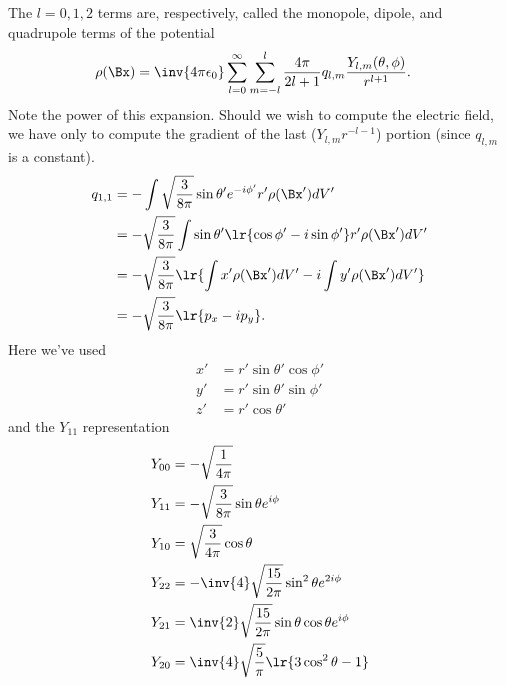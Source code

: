 %
The \( l = 0,1,2\) terms are, respectively, called the monopole, dipole, and quadrupole terms of the potential
\begin{equation}\label{eqn:emtLecture8:500}
\begin{aligned}
\rho(\Bx) &=
\inv{4 \pi \epsilon_0}
\sum_{l = 0}^\infty \sum_{m = -l}^l \frac{4\pi} {2 l + 1}
q_{l,m}
\frac{
Y_{l,m}(\theta, \phi)
}
{
r^{l+1}
}.
\end{aligned}
\end{equation}
%
Note the power of this expansion.  Should we wish to compute the electric field, we have only to compute the gradient of  the last (\(Y_{l,m} r^{-l-1} \)) portion (since \( q_{l,m} \) is a constant).
%
\begin{equation}\label{eqn:emtLecture8:520}
\begin{aligned}
q_{1,1}
&=
-\int \sqrt{\frac{3}{8 \pi}} \sin\theta' e^{-i\phi'} r' \rho(\Bx') dV'
\\ &=
-\sqrt{\frac{3}{8 \pi}} \int \sin\theta' \lr{ \cos\phi' - i\sin\phi'} r' \rho(\Bx') dV'
\\ &=
-\sqrt{\frac{3}{8 \pi}} \lr{
\int x' \rho(\Bx') dV'
-i \int y' \rho(\Bx') dV'
}
\\ &=
-\sqrt{\frac{3}{8 \pi}} \lr{
p_x - i p_y
}.
\end{aligned}
\end{equation}
%
Here we've used
\begin{equation}\label{eqn:emtLecture8:540}
\begin{aligned}
x' &= r' \sin\theta' \cos\phi' \\
y' &= r' \sin\theta' \sin\phi' \\
z' &= r' \cos\theta'
\end{aligned}
\end{equation}
%
and the \( Y_{11} \) representation
%
\begin{equation}\label{eqn:emtLecture8:560}
\begin{aligned}
Y_{00} &= -\sqrt{\frac{1}{4 \pi}} \\
Y_{11} &= -\sqrt{\frac{3}{8 \pi}} \sin\theta e^{i\phi} \\
Y_{10} &=  \sqrt{\frac{3}{4 \pi}} \cos\theta  \\
Y_{22} &= -\inv{4} \sqrt{\frac{15}{2 \pi}} \sin^2\theta e^{2 i\phi} \\
Y_{21} &=  \inv{2} \sqrt{\frac{15}{2 \pi}} \sin\theta \cos\theta e^{i\phi} \\
Y_{20} &=  \inv{4} \sqrt{\frac{5}{\pi}} \lr{ 3 \cos^2\theta - 1 } \\
\end{aligned}
\end{equation}
